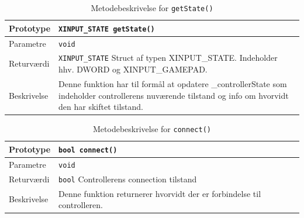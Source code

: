 \begin{table}[h]
\begin{tabularx}{\textwidth}{| L{2.5 cm} | Z |} \hline
Prototype 	& \texttt{XINPUT\_STATE getState()} \\\hline
Parametre 	& \texttt{void}				\newline \\\hline
Returværdi	& \texttt{XINPUT\_STATE} 	\newline Struct af typen XINPUT\_STATE. Indeholder hhv. DWORD og XINPUT\_GAMEPAD. \\\hline
Beskrivelse	& Denne funktion har til formål at opdatere \_controllerState som indeholder controllerens nuværende tilstand og info om hvorvidt den har skiftet tilstand. \\\hline
\end{tabularx}
\caption{Metodebeskrivelse for \texttt{getState()}}
\label{table:met_getstate}
\end{table}

\begin{table}[h]
\begin{tabularx}{\textwidth}{| L{2.5 cm} | Z |} \hline
Prototype 	& \texttt{bool connect()} \\\hline
Parametre 	& \texttt{void}				\newline \\\hline
Returværdi	& \texttt{bool} 			\newline Controllerens connection tilstand \\\hline
Beskrivelse	&  Denne funktion returnerer hvorvidt der er forbindelse til controlleren. \\\hline
\end{tabularx}
\caption{Metodebeskrivelse for \texttt{connect()}}
\label{table:met_connect}
\end{table}

\clearpage

